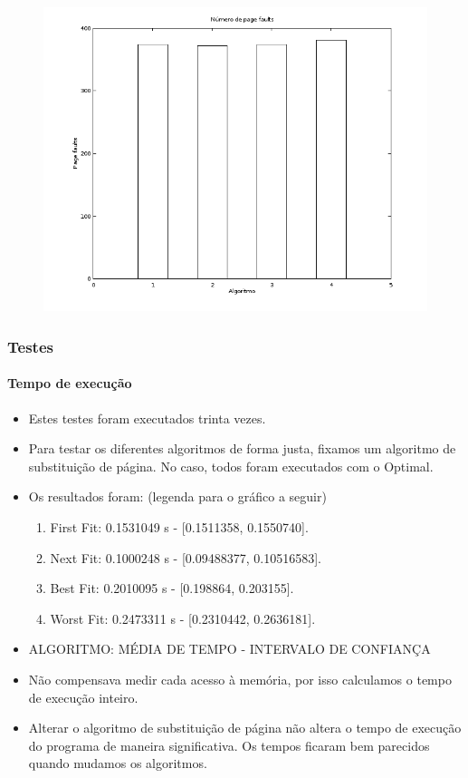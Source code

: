 \documentclass{beamer}
\begin{document}
\begin{frame}
	\begin{figure}[!h]
		\centering
		\includegraphics[scale=0.4]{c.png}
	\end{figure}
\end{frame}

\begin{frame}
	\frametitle{Testes}
	\framesubtitle{Tempo de execução}
	\begin{itemize}
		\item Estes testes foram executados trinta vezes.
		\item Para testar os diferentes algoritmos de forma justa, fixamos um algoritmo de substituição de página. No caso, todos foram executados com o Optimal.
		\item Os resultados foram: (legenda para o gráfico a seguir)
		\begin{enumerate}
			\item First Fit: 0.1531049 s - [0.1511358, 0.1550740].
			\item Next Fit: 0.1000248 s - [0.09488377, 0.10516583].
			\item Best Fit: 0.2010095 s - [0.198864, 0.203155].
			\item Worst Fit: 0.2473311 s - [0.2310442, 0.2636181].
		\end{enumerate}
		\item ALGORITMO: MÉDIA DE TEMPO - INTERVALO DE CONFIANÇA
		\item Não compensava medir cada acesso à memória, por isso calculamos o tempo de execução inteiro.
		\item Alterar o algoritmo de substituição de página não altera o tempo de execução do programa de maneira significativa. Os tempos ficaram bem parecidos quando mudamos os algoritmos.
	\end{itemize}
\end{frame}
\end{document}
